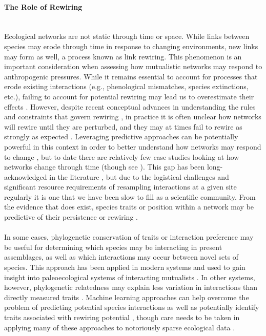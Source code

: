 \paragraph*{The Role of Rewiring}\mbox{}\\
Ecological networks are not static through time or space. While links between species may erode through time in response to changing environments, new links may form as well, a process known as link rewiring. This phenomenon is an important consideration when assessing how mutualistic networks may respond to anthropogenic pressures. While it remains essential to account for processes that erode existing interactions (e.g., phenological mismatches, species extinctions, etc.), failing to account for potential rewiring may lead us to overestimate their effects \parencite{vizentin2020including}. However, despite recent conceptual advances in understanding the rules and constraints that govern rewiring \parencite{corlett2011frugivore, fuzessy2024navigating}, in practice it is often unclear how networks will rewire until they are perturbed, and they may at times fail to rewire as strongly as expected \parencite{leimberger2023plant}. Leveraging predictive approaches can be potentially powerful in this context in order to better understand how networks may respond to change \parencite{eklof2013dimensionality, vizentin2020including, strydom2021roadmap, strydom2023graph, nunes2024estimated}, but to date there are relatively few case studies looking at how networks change through time (though see \parencite{burkle2013plant, olesen2011strong, leimberger2023plant, petanidou2008long}). This gap has been long-acknowledged in the literature \parencite{bascompte2007plant}, but due to the logistical challenges and significant resource requirements of resampling interactions at a given site regularly it is one that we have been slow to fill as a scientific community. From the evidence that does exist, species traits or position within a network may be predictive of their persistence \parencite{burkle2013plant} or rewiring \parencite{sandor2024spatial}.

\paragraph{}
In some cases, phylogenetic conservation of traits or interaction preference may be useful for determining which species may be interacting in present assemblages, as well as which interactions may occur between novel sets of species. This approach has been applied in modern systems \parencite{VizentinBugoni2021} and used to gain insight into paleoecological systems of interacting mutualists \parencite{Braga21}. In other systems, however, phylogenetic relatedness may explain less variation in interactions than directly measured traits \parencite{rafferty2013}. Machine learning approaches can help overcome the problem of predicting potential species interactions as well as potentially identify traits associated with rewiring potential \parencite{pichler2020machine, foster2026comparing}, though care needs to be taken in applying many of these approaches to notoriously sparse ecological data \parencite{poisot2023guidelines}.

